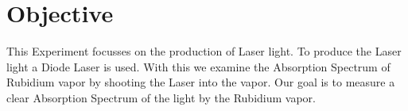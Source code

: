 \section{Objective}
\label{sec:Zielsetzung}

This Experiment focusses on the production of Laser light.
To produce the Laser light a Diode Laser is used.
With this we examine the Absorption Spectrum of Rubidium vapor by shooting the Laser into the vapor.
Our goal is to measure a clear Absorption Spectrum of the light by the Rubidium vapor.